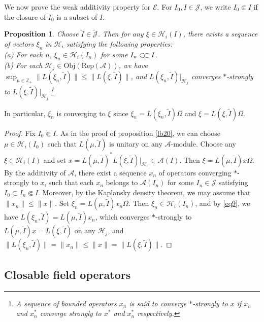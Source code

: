 \documentclass[11pt,b5paper,notitlepage]{article}
\theoremstyle{definition}
\theoremstyle{plain}
\newtheorem{pp}[df]{Proposition}
\newcommand{\mc}{\mathcal}
\newcommand{\wtd}{\widetilde}
\newcommand{\scr}{\mathscr}
\newcommand{\Jtd}{\widetilde{\mathcal J}}
\newcommand{\RepA}{\mathrm{Rep}(\mc A)}
\newcommand{\mbb}{\mathbb}
\newcommand{\Obj}{\mathrm{Obj}}
\numberwithin{equation}{subsection}
\begin{document}
We now prove the weak additivity property for $\scr E$. For $I_0,I\in\mc J$, we write $I_0\Subset I$ if the closure of $I_0$ is a subset of $I$.

\begin{pp}\label{lb7}
Choose $\wtd I\in\Jtd$. Then for any $\xi\in\mc H_i(I)$, there exists a sequence of vectors $\xi_n$ in $\mc H_i$ satisfying the following properties:\\
	(a) For each $n$, $\xi_n\in\mc H_i(I_n)$ for some $I_n\subset\joinrel\subset I$.\\
	(b) For each $\mc H_j\in\Obj(\RepA)$, we have $\sup_{n\in\mbb Z_+}\big\lVert L(\xi_n,\wtd I) \big\lVert\leq\big\lVert L(\xi,\wtd I) \big\lVert$, and $L(\xi_n,\wtd I)|_{\mc H_j}$ converges $*$-strongly to $L(\xi,\wtd I)|_{\mc H_j}$.\footnote{A sequence of bounded operators $x_n$ is said to converge $*$-strongly to $x$ if $x_n$ and $x_n^*$ converge strongly to $x^*$ and $x_n^*$ respectively.}
\end{pp}
In particular, $\xi_n$ is converging to $\xi$ since $\xi_n=L(\xi_n,\wtd I)\Omega$ and $\xi=L(\xi,\wtd I)\Omega$.

\begin{proof}
Fix $I_0\Subset I$. As in the proof of proposition \ref{lb20}, we can choose $\mu\in\mc H_i(I_0)$ such that $L(\mu,\wtd I)$ is unitary on any $\mc A$-module. Choose any $\xi\in\mc H_i(I)$ and set $x=L(\mu,\wtd I)^*L(\xi,\wtd I)|_{\mc H_0}\in\mc A(I)$. Then $\xi=L(\mu,\wtd I)x\Omega$.  By the additivity of $\mc A$, there exist a sequence  $x_n$ of operators converging $*$-strongly to $x$, such that each $x_n$ belongs to $\mc A(I_n)$ for some $I_n\in\mc J$ satisfying $I_0\subset I_n\Subset I$. Moreover, by the Kaplansky density theorem, we may assume that $\lVert x_n\lVert\leq\lVert x\lVert$. Set $\xi_n=L(\mu,\wtd I)x_n\Omega$. Then $\xi_n\in\mc H_i(I_n)$, and by \eqref{eq9}, we have $L(\xi_n,\wtd I)=L(\mu,\wtd I)x_n$, which converges $*$-strongly to $L(\mu,\wtd I)x=L(\xi,\wtd I)$ on any $\mc H_j$, and $\big\lVert L(\xi_n,\wtd I)\big\lVert= \lVert x_n\lVert\leq \lVert x\lVert=\big\lVert L(\xi,\wtd I)\big\lVert$.
\end{proof}





\subsection{Closable field operators}\label{lb11}
\end{document}
